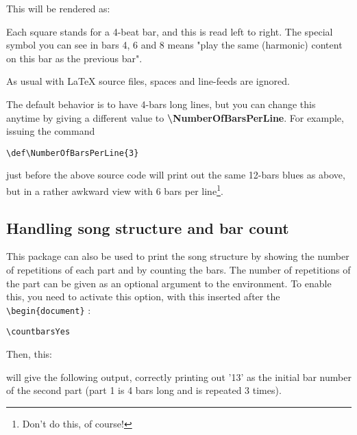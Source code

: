 \documentclass[11pt]{article}
\newcommand{\btt}{\bfseries \ttfamily }
\newcommand{\tbs}{\textbackslash{}}
\begin{document}
\def\chordFontSize{\huge\bfseries}



This will be rendered as:



Each square stands for a 4-beat bar, and this is read left to right.
The special symbol you can see in bars 4, 6 and 8 means "play the same (harmonic) content on this bar as the previous bar".

As usual with \LaTeX{} source files, spaces and line-feeds are ignored.

The default behavior is to have 4-bars long lines, but you can change this anytime by giving a different value to {\btt \tbs NumberOfBarsPerLine}. For example, issuing the command


\begin{lstlisting}
\def\NumberOfBarsPerLine{3}
\end{lstlisting}

just before the above source code will print out the same 12-bars blues as above, but in a rather awkward view with 6 bars per line\footnote{Don't do this, of course!}.

\def\NumberOfBarsPerLine{6}


\subsection{Handling song structure and bar count}

This package can also be used to print the song structure by showing the number of repetitions of each part and by counting the bars.
The number of repetitions of the part can be given as an optional argument to the environment.
To enable this, you need to activate this option, with this inserted after the \verb!\begin{document}! :

\begin{lstlisting}
\countbarsYes
\end{lstlisting}

Then, this:


will give the following output, correctly printing out '13' as the initial bar number of the second part (part 1 is 4 bars long and is repeated 3 times).

\def\NumberOfBarsPerLine{4}
\resetchordbars
\countbarsYes

\end{document}
